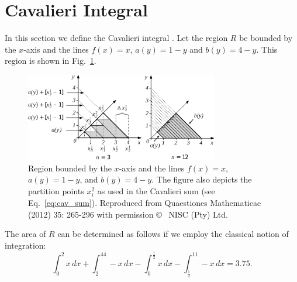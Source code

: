 \documentclass{article}
\theoremstyle{theorem}
\theoremstyle{definition}
\begin{document}
\section{Cavalieri Integral}
In this section we define the Cavalieri integral \cite{ackermann12}. Let the region $R$ be bounded by the $x$-axis and the lines $f(x)=x$, $a(y)=1-y$ and $b(y)=4-y$. This region is shown in Fig.~\ref{fig:caval2}.\\
\begin{figure}[htb]
\centering
\includegraphics[width=0.75\textwidth]{fig13.eps}
\caption{Region bounded by the $x$-axis and the lines $f(x)=x$, $a(y)=1-y$, and $b(y)=4-y$. The figure also depicts the partition points $x_i^2$ as used in the Cavalieri sum (see Eq.~\ref{eq:cav_sum}). Reproduced from Quaestiones Mathematicae (2012) 35: 265-296 with permission \copyright~ NISC (Pty) Ltd.}
\label{fig:caval2}
\end{figure}

\noindent
The area of $R$ can be determined as follows if we employ the classical notion of integration:
\begin{equation}
\int_0^2x\, dx+\int_2^44-x\, dx- \int_0^{\frac{1}{2}}x\, dx-\int_{\frac{1}{2}}^11-x\, dx = 3.75. 
\end{equation}
\end{document}
